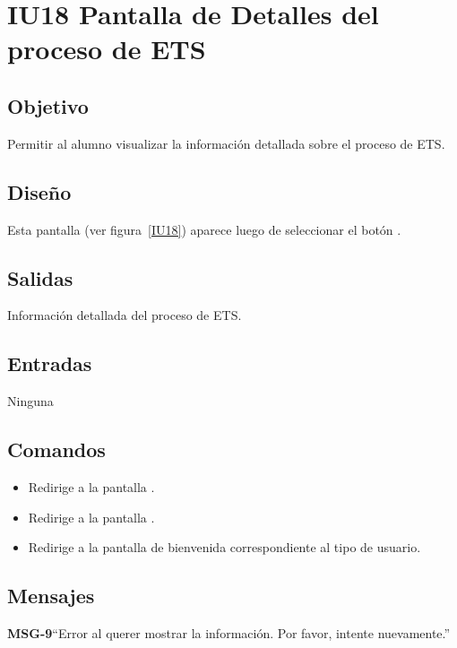 \section{IU18 Pantalla de Detalles del proceso de ETS}

\subsection{Objetivo}
Permitir al alumno visualizar la información detallada sobre el proceso de ETS.

\subsection{Diseño}
Esta pantalla  (ver figura~\ref{IU18}) aparece luego de seleccionar el botón . 


\subsection{Salidas}

Información detallada del proceso de ETS. 

\subsection{Entradas}
Ninguna


\subsection{Comandos}
\begin{itemize}
	\item {} Redirige a la pantalla .
	\item {} Redirige a la pantalla .
	\item {} Redirige a la pantalla de bienvenida correspondiente al tipo de usuario.
\end{itemize}
\subsection{Mensajes}

\begin{Citemize}
	\item {\bf MSG-9}{``Error al querer mostrar la información. Por favor, intente nuevamente.''}
\end{Citemize}

